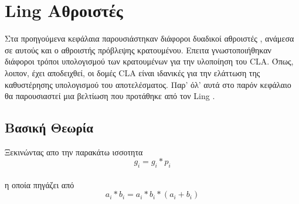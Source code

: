 \section{Ling Αθροιστές}
Στα προηγούμενα κεφάλαια παρουσιάστηκαν διάφοροι δυαδικοί αθροιστές , 
ανάμεσα σε αυτούς και ο αθροιστής πρόβλεψης κρατουμένου. Επειτα γνωστοποιήθηκαν 
διάφοροι τρόποι υπολογισμού των κρατουμένων για την υλοποίηση του CLA. Όπως, λοιπον,
έχει αποδειχθεί, οι δομές CLA είναι ιδανικές για την ελάττωση της καθυστέρησης υπολογισμού
του αποτελέσματος. Παρ' όλ' αυτά στο παρόν κεφάλαιο θα παρουσιαστεί μια βελτίωση που προτάθηκε 
από τον Ling \cite{ling}.



\subsection{Βασική Θεωρία}

Ξεκινώντας απο την παρακάτω ισσοτητα 
\begin{equation}
    g_i = g_i*p_i
\end{equation}
\\
η οποία πηγάζει από 
\begin{equation*}
    a_i * b_i = a_i * b_i * (a_i + b_i)
\end{equation*}

